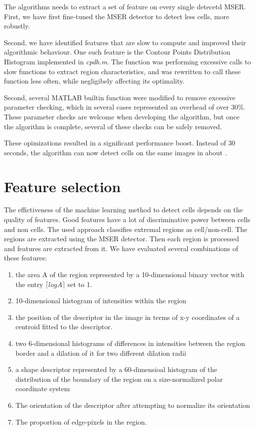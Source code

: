 	The algorithms needs to extract a set of feature on every single detecetd MSER. First, we have first fine-tuned the MSER detector to detect less cells, more robustly.
	
	Second, we have identified features that are slow to compute and improved their algorithmic behaviour. One such feature is the Contour Points Distribution Histogram implemented in \textit{cpdh.m}. The function was performing excessive calls to slow functions to extract region characteristics, and was rewritten to call these function less often, while negligibely affecting its optimality.
	
	Second, several MATLAB builtin function were modified to remove excessive parameter checking, which in several cases represented an overhead of over $30\%$. These parameter checks are welcome when developing the algorithm, but once the algorithm is complete, several of these checks can be safely removed.
	
	These opimizations resulted in a significant performance boost. Instead of 30 seconds, the algorithm can now detect cells on the same images in about .
	
	\section{Feature selection }
	
	The effictiveness of the machine learning method to detect cells depends on the quality of features. Good features have a lot of discriminative power between cells and non cells. The used approach classifies extremal regions as cell/non-cell. The regions are extracted using the MSER detector. Then each region is processed and features are extracted from it. We have evaluated several combinations of these features:
	
	\begin{enumerate}
	    \item the area A of the region represented by a 10-dimensional binary vector with the entry $\lceil log A \rceil $ set to 1.
		\item 10-dimensional histogram of intensities within the region
	    \item the position of the descriptor in the image in terms of x-y coordinates of a centroid fitted to the descriptor.
	    \item two 6-dimensional histograms of differences in intensities between the region border and a dilation of it for two different dilation radii
	    \item a shape descriptor represented by a 60-dimensioal histogram of the distribution of the boundary of the region on a size-normalized polar coordinate system
	    \item The orientation of the descriptor after attempting to normalize its orientation
	    \item The proportion of edge-pixels in the region.
	\end{enumerate}
	
